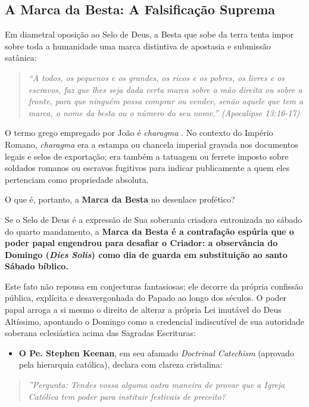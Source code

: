 \documentclass[11pt,a4paper,openany]{book}
\begin{document}
\subsection{A Marca da Besta: A Falsificação Suprema}


Em diametral oposição ao Selo de Deus, a Besta que sobe da terra tenta impor sobre toda a humanidade uma marca distintiva de apostasia e submissão satânica:


\begin{quote}
\itshape \textit{``A todos, os pequenos e os grandes, os ricos e os pobres, os livres e os escravos, faz que lhes seja dada certa marca sobre a mão direita ou sobre a fronte, para que ninguém possa comprar ou vender, senão aquele que tem a marca, o nome da besta ou o número do seu nome.''} (Apocalipse 13:16-17)
\end{quote}


O termo grego empregado por João é \textit{charagma} . No contexto do Império Romano, \textit{charagma} era a estampa ou chancela imperial gravada nos documentos legais e selos de exportação; era também a tatuagem ou ferrete imposto sobre soldados romanos ou escravos fugitivos para indicar publicamente a quem eles pertenciam como propriedade absoluta.

O que é, portanto, a \textbf{Marca da Besta} no desenlace profético?

Se o Selo de Deus é a expressão de Sua soberania criadora entronizada no sábado do quarto mandamento, a \textbf{Marca da Besta é a contrafação espúria que o poder papal engendrou para desafiar o Criador: a observância do Domingo (\textit{Dies Solis}) como dia de guarda em substituição ao santo Sábado bíblico.}

Este fato não repousa em conjecturas fantasiosas; ele decorre da própria confissão pública, explícita e desavergonhada do Papado ao longo dos séculos. O poder papal arroga a si mesmo o direito de alterar a própria Lei imutável do Deus Altíssimo, apontando o Domingo como a credencial indiscutível de sua autoridade soberana eclesiástica acima das Sagradas Escrituras:

\begin{itemize}
  \item \textbf{O Pe. Stephen Keenan}, em seu afamado \textit{Doctrinal Catechism} (aprovado pela hierarquia católica), declara com clareza cristalina:
\end{itemize}


\begin{quote}
\itshape \textit{''Pergunta: Tendes vossa alguma outra maneira de provar que a Igreja Católica tem poder para instituir festivais de preceito?}
\end{quote}
\end{document}
